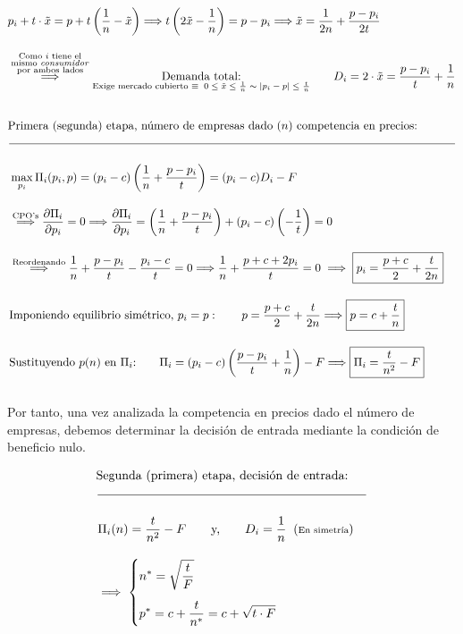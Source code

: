 \documentclass[10pt,a4paper]{article}
\begin{document}
$$\begin{aligned}
    &p_i+t\cdot\tilde x=p+t\left(\frac{1}{n}-\tilde x\right)\Longrightarrow t\left(2\tilde x-\frac{1}{n}\right)=p-p_i\Longrightarrow \tilde  x=\frac{1}{2n}+\frac{p-p_i}{2t}\\[1em]
    &\overset{\substack{\text{\scriptsize Como $i$ tiene el}\\\text{\scriptsize mismo \textit{consumidor}}\\\text{\scriptsize por ambos lados}}}{\Longrightarrow}\underset{\text{\scriptsize Exige mercado cubierto $\equiv\;0\leq \tilde x\leq \frac{1}{n}\sim |p_i-p|\leq \frac{t}{n}$}}{\text{Demanda total:}}\qquad D_i=2\cdot \tilde x=\frac{p-p_i}{t}+\frac{1}{n}\\[2em]
    &\text{Primera (segunda) etapa, número de empresas dado ($n$) competencia en precios:}\\
    &\over\begin{aligned}
        \\
        &\max_{p_i}\Pi_i(p_i,p)=(p_i-c)\left(\frac{1}{n}+\frac{p-p_i}{t}\right)=(p_i-c)D_i-F\\[1em]
        &\overset{\text{\scriptsize CPO's}}{\Longrightarrow}\frac{\partial\Pi_i}{\partial p_i}=0\Longrightarrow\frac{\partial \Pi_i}{\partial p_i}=\left(\frac{1}{n}+\frac{p-p_i}{t}\right)+(p_i-c)\left(-\frac{1}{t}\right)=0\\[1em]
        &\overset{\text{\scriptsize Reordenando}}{\Longrightarrow}\frac{1}{n}+\frac{p-p_i}{t}-\frac{p_i-c}{t}=0\Longrightarrow\frac{1}{n}+\frac{p+c+2p_i}{t}=0\;\Longrightarrow\;\boxed{p_i=\frac{p+c}{2}+\frac{t}{2n}}\\[1em]
        &\text{Imponiendo equilibrio simétrico, $p_i=p$}:\qquad p=\frac{p+c}{2}+\frac{t}{2n}\Longrightarrow \boxed{p=c+\frac{t}{n}}\\[1em]
        &\text{Sustituyendo $p(n)$ en $\Pi_i$:}\qquad \Pi_i=(p_i-c)\left(\frac{p-p_i}{t}+\frac{1}{n}\right)-F\Longrightarrow\boxed{\Pi_i=\frac{t}{n^2}-F}\\[1em]
    \end{aligned}
\end{aligned}$$

Por tanto, una vez analizada la competencia en precios dado el número de empresas, debemos determinar la decisión de entrada mediante la condición de beneficio nulo. 

$$\begin{aligned}
    &\text{Segunda (primera) etapa, decisión de entrada:}\\
    &\over\begin{aligned}
        \\
        &\Pi_i(n)=\frac{t}{n^2}-F\qquad \text{y,}\qquad D_i=\frac{1}{n}\;\;(\text{\scriptsize En simetría})\\[1em]
        &\Longrightarrow\;
        \left\{\begin{aligned}
            &n^*=\sqrt{\frac{t}{F}}\\[0.5em]
            &p^*=c+\frac{t}{n^*}=c+\sqrt{t\cdot F}
        \end{aligned}\right.
    \end{aligned}
\end{aligned}$$
\end{document}
